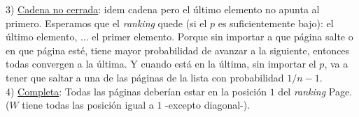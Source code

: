 			3) \underline{Cadena no cerrada}: idem cadena pero el último elemento no apunta al primero. Esperamos que el \textit{ranking} quede (si el $p$ es suficientemente bajo): el último elemento, ... el primer elemento. Porque sin importar a que página salte o en que página esté, tiene mayor probabilidad de avanzar a la siguiente, entonces todas convergen a la última. Y cuando está en la última, sin importar el $p$, va a tener que saltar a una de las páginas de la lista con probabilidad $1/n-1$.\\

			4) \underline{Completa}: Todas las páginas deberían estar en la posición $1$ del \textit{ranking} Page. ($W$ tiene todas las posición igual a $1$ -excepto diagonal-).\\

